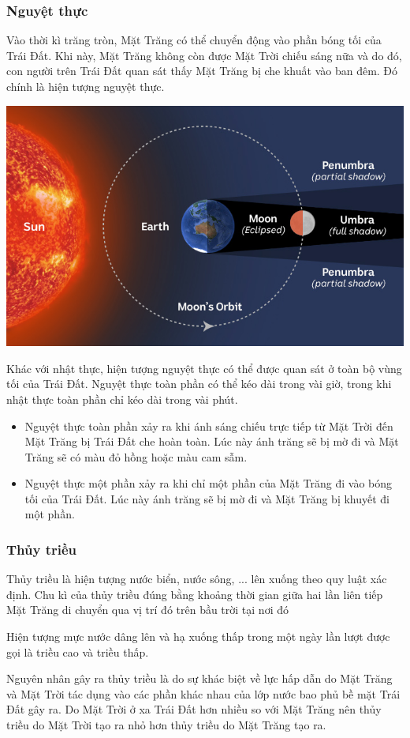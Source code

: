 \subsubsection{Nguyệt thực}
Vào thời kì trăng tròn, Mặt Trăng có thể chuyển động vào phần bóng tối của Trái Đất. Khi này, Mặt Trăng không còn được Mặt Trời chiếu sáng nữa và do đó, con người trên Trái Đất quan sát thấy Mặt Trăng bị che khuất vào ban đêm. Đó chính là hiện tượng nguyệt thực.
\begin{center}
	\includegraphics[width=0.6\linewidth]{../figs/G10-035-3.jpg}
\end{center}
Khác với nhật thực, hiện tượng nguyệt thực có thể được quan sát ở toàn bộ vùng tối của Trái Đất. Nguyệt thực toàn phần có thể kéo dài trong vài giờ, trong khi nhật thực toàn phần chỉ kéo dài trong vài phút.
\begin{itemize}
	\item Nguyệt thực toàn phần xảy ra khi ánh sáng chiếu trực tiếp từ Mặt Trời đến Mặt Trăng bị Trái Đất che hoàn toàn. Lúc này ánh trăng sẽ bị mờ đi và Mặt Trăng sẽ có màu đỏ hồng hoặc màu cam sẫm.
	\item Nguyệt thực một phần xảy ra khi chỉ một phần của Mặt Trăng đi vào bóng tối của Trái Đất. Lúc này ánh trăng sẽ bị mờ đi và Mặt Trăng bị khuyết đi một phần.
\end{itemize}

\subsubsection{Thủy triều}
Thủy triều là hiện tượng nước biển, nước sông, ... lên xuống theo quy luật xác định. Chu kì của thủy triều đúng bằng khoảng thời gian giữa hai lần liên tiếp Mặt Trăng di chuyển qua vị trí đó trên bầu trời tại nơi đó

Hiện tượng mực nước dâng lên và hạ xuống thấp trong một ngày lần lượt được gọi là triều cao và triều thấp.

Nguyên nhân gây ra thủy triều là do sự khác biệt về lực hấp dẫn do Mặt Trăng và Mặt Trời tác dụng vào các phần khác nhau của lớp nước bao phủ bề mặt Trái Đất gây ra. Do Mặt Trời ở xa Trái Đất hơn nhiều so với Mặt Trăng nên thủy triều do Mặt Trời tạo ra nhỏ hơn thủy triều do Mặt Trăng tạo ra.

